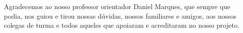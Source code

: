 \begin{agradecimentos}
Agradecemos ao nosso professor orientador Daniel Marques, que sempre que podia, nos guiou e tirou nossas dúvidas, nossos familiares e amigos, aos nossos colegas de turma e todos aqueles que apoiaram e acreditaram no nosso projeto.


\end{agradecimentos}
